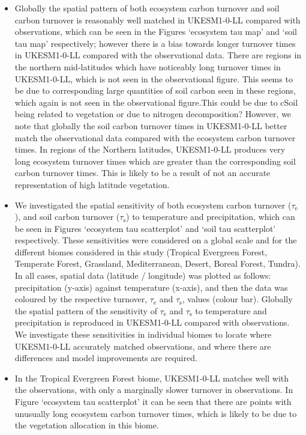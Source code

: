\documentclass[bg, manuscript]{copernicus}
\begin{document}
\begin{itemize}

	\item Globally the spatial pattern of both ecosystem carbon turnover and soil carbon turnover is reasonably well matched in UKESM1-0-LL compared with observations, which can be seen in the Figures `ecosystem tau map' and `soil tau map' respectively; however there is a bias towards longer turnover times in UKESM1-0-LL compared with the observational data. There are regions in the northern mid-latitudes which have noticeably long turnover times in UKESM1-0-LL, which is not seen in the observational figure. This seems to be due to corresponding large quantities of soil carbon seen in these regions, which again is not seen in the observational figure.This could be due to cSoil being related to vegetation or due to nitrogen decomposition? However, we note that globally the soil carbon turnover times in UKESM1-0-LL better match the observational data compared with the ecosystem carbon turnover times. In regions of the Northern latitudes, UKESM1-0-LL produces very long ecosystem turnover times which are greater than the corresponding soil carbon turnover times. This is likely to be a result of not an accurate representation of high latitude vegetation.
	
	\item We investigated the spatial sensitivity of both ecosystem carbon turnover ($\tau_\mathrm{e}$), and soil carbon turnover ($\tau_\mathrm{s}$) to temperature and precipitation, which can be seen in Figures `ecosystem tau scatterplot' and `soil tau scatterplot' respectively. These sensitivities were considered on a global scale and for the different biomes considered in this study (Tropical Evergreen Forest, Temperate Forest, Grassland, Mediterranean, Desert, Boreal Forest, Tundra). In all cases, spatial data (latitude / longitude) was plotted as follows: precipitation (y-axis) against temperature (x-axis), and then the data was coloured by the respective turnover, $\tau_\mathrm{e}$ and $\tau_\mathrm{s}$, values (colour bar). Globally the spatial pattern of the sensitivity of $\tau_\mathrm{e}$ and $\tau_\mathrm{s}$ to temperature and precipitation is reproduced in UKESM1-0-LL compared with observations. We investigate these sensitivities in individual biomes to locate where UKESM1-0-LL accurately matched observations, and where there are differences and model improvements are required.
	
	\item In the Tropical Evergreen Forest biome, UKESM1-0-LL matches well with the observations, with only a marginally slower turnover in observations. In Figure `ecosystem tau scatterplot' it can be seen that there are points with unusually long ecosystem carbon turnover times, which is likely to be due to the vegetation allocation in this biome.
	

\end{itemize}
\end{document}
